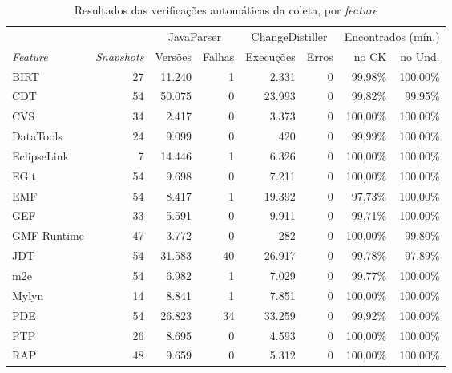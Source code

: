 \begin{table}[htbp]
    \centering
    \footnotesize
    \caption{Resultados das verificações automáticas da coleta, por \textit{feature}}
    \label{tab:ap-verificacoes}
    \begin{tabular}{@{}lrrrrrrr@{}}
        \toprule
        & & \multicolumn{2}{c}{JavaParser} & \multicolumn{2}{c}{ChangeDistiller} & \multicolumn{2}{c}{Encontrados (mín.)} \\
        \cmidrule(lr){3-4}\cmidrule(lr){5-6}\cmidrule(l){7-8}
        \textit{Feature} & \textit{Snapshots} & Versões & Falhas & Execuções & Erros & no CK & no Und. \\
        \midrule
        BIRT           & 27 & 11.240 &   1 &  2.331 & 0 & 99,98\% & 100,00\% \\
        CDT            & 54 & 50.075 &   0 & 23.993 & 0 & 99,82\% &  99,95\% \\
        CVS            & 34 &  2.417 &   0 &  3.373 & 0 & 100,00\% & 100,00\% \\
        DataTools      & 24 &  9.099 &   0 &    420 & 0 & 99,99\% & 100,00\% \\
        EclipseLink    &  7 & 14.446 &   1 &  6.326 & 0 & 100,00\% & 100,00\% \\
        EGit           & 54 &  9.698 &   0 &  7.211 & 0 & 100,00\% & 100,00\% \\
        EMF            & 54 &  8.417 &   1 & 19.392 & 0 & 97,73\% & 100,00\% \\
        GEF            & 33 &  5.591 &   0 &  9.911 & 0 & 99,71\% & 100,00\% \\
        GMF Runtime    & 47 &  3.772 &   0 &    282 & 0 & 100,00\% &  99,80\% \\
        JDT            & 54 & 31.583 &  40 & 26.917 & 0 & 99,78\% &  97,89\% \\
        m2e            & 54 &  6.982 &   1 &  7.029 & 0 & 99,77\% & 100,00\% \\
        Mylyn          & 14 &  8.841 &   1 &  7.851 & 0 & 100,00\% & 100,00\% \\
        PDE            & 54 & 26.823 &  34 & 33.259 & 0 & 99,92\% & 100,00\% \\
        PTP            & 26 &  8.695 &   0 &  4.593 & 0 & 100,00\% & 100,00\% \\
        RAP            & 48 &  9.659 &   0 &  5.312 & 0 & 100,00\% & 100,00\% \\

\end{tabular}
\end{table}
